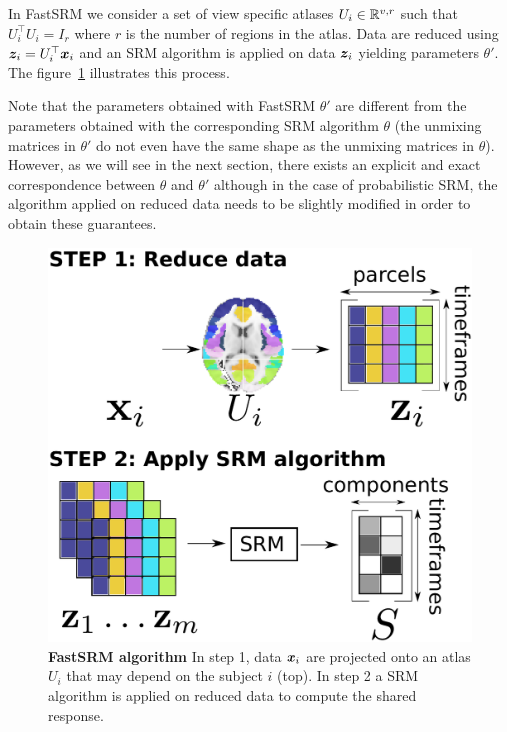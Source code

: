 In FastSRM we consider a set of view specific atlases $U_i \in \mathbb{R}^{v, r}$ such that
$U_i^{\top}U_i = I_r$ where $r$ is the number of regions in the atlas.
Data are reduced using $\boldsymbol{z}_i = U_i^{\top} \boldsymbol{x}_i$ and an SRM algorithm is applied
on data $\boldsymbol{z}_i$ yielding parameters $\theta'$.
The figure~\ref{fig:srm:conceptual} illustrates this process.

Note that the parameters obtained with FastSRM $\theta'$ are different
from the parameters obtained with the corresponding SRM algorithm $\theta$ (the unmixing matrices in $\theta'$ do not even have the same shape as the unmixing matrices in $\theta$).
However, as we will see in the next section, there exists an explicit and exact
correspondence between $\theta$ and $\theta'$ although in the case of
probabilistic SRM, the algorithm applied on reduced data needs to be slightly modified in order to
obtain these guarantees. 

\begin{figure}
  \centering
  \includegraphics[scale=0.34]{figures/srm/conceptual_figure2.pdf}
  \caption{\textbf{FastSRM algorithm} In step 1, data $\boldsymbol{x}_i$ are projected onto an
    atlas $U_i$ that may depend on the subject $i$ (top). In step 2 a SRM algorithm is applied on reduced data to compute the shared response.}
  \label{fig:srm:conceptual}
\end{figure}

